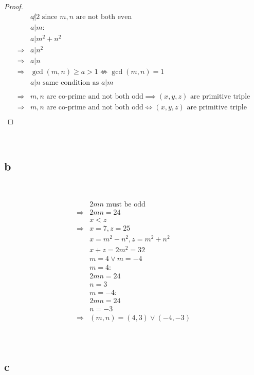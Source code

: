 \documentclass{article}
\begin{document}
\begin{proof}
\begin{align*}
        &a \not| 2\text{ since }m,n\text{ are not both even}\\
        &a |m:\\
        &a|m^2+n^2\\
        \Rightarrow&a|n^2\\
        \Rightarrow&a|n\\
        \Rightarrow&\gcd(m,n)\geqslant a>1\nLeftrightarrow\gcd(m,n)=1\\
        &a|n\text{ same condition as }a|m\\
        &\\
        \Rightarrow& m,n\text{ are co-prime and not both odd}\implies(x,y,z)\text{ are primitive triple}\\
        \Rightarrow&m,n\text{ are co-prime and not both odd}\Leftrightarrow(x,y,z)\text{ are primitive triple}\\
    \end{align*}
\end{proof}

~

\subsection*{b}

~

\begin{align*}
    &2mn\text{ must be odd}\\
    \Rightarrow&2mn=24\\
    &x<z\\
    \Rightarrow&x=7,z=25\\
    &x=m^2-n^2,z=m^2+n^2\\
    &x+z=2m^2=32\\
    &m=4\lor m=-4\\
    &m=4:\\
    &2mn=24\\
    &n=3\\
    &m=-4:\\
    &2mn=24\\
    &n=-3\\
    \Rightarrow&(m,n)=(4,3)\lor(-4,-3)\\
\end{align*}

~

\subsection*{c}
\end{document}

